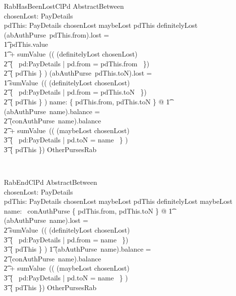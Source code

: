 \begin{LSDef}
\begin{schema}{RabHasBeenLostClPd}
  AbstractBetween
  \\ %
  chosenLost: \power PayDetails
  \\ %
  pdThis: PayDetails
\where %
  chosenLost \subseteq maybeLost
  \also %
  pdThis \in definitelyLost
  \also %
  (abAuthPurse~pdThis.from).lost =
  \\ %
  \t1 pdThis.value
  \\ %
  \t1 {} + sumValue~(( (definitelyLost \cup chosenLost)
  \\ %
  \t2 {} \cap \{~ pd:PayDetails | pd.from = pdThis.from ~\})
  \\ %
  \t2 \setminus \{ pdThis \} )
  \also %
  (abAuthPurse~pdThis.toN).lost =
  \\ %
  \t1 sumValue~(( (definitelyLost \cup chosenLost)
  \\ %
  \t2 {} \cap \{~ pd:PayDetails | pd.from = pdThis.toN ~\})
  \\ %
  \t2 \setminus \{ pdThis \} )
  \also %
  \forall name: \{ pdThis.from, pdThis.toN \} @
  \also %
  \t1 (abAuthPurse~name).balance =
  \\ %
  \t2 (conAuthPurse~name).balance
  \\ %
  \t2 {} + sumValue~(( (maybeLost \setminus chosenLost)
  \\ %
  \t3 {} \cap \{~ pd:PayDetails | pd.toN = name ~\} )
  \\ %
  \t3 \setminus \{ pdThis \})
  \also %
  OtherPursesRab
\end{schema}~\end{LSDef}

\begin{LSDef}
\begin{schema}{RabEndClPd}
  AbstractBetween
  \\ %
  chosenLost: \power PayDetails
  \\ %
  pdThis: PayDetails
\where %
  chosenLost \subseteq maybeLost
  \also %
  pdThis \notin definitelyLost \cup maybeLost
  \also %
  \forall name: \dom~conAuthPurse \cap \{ pdThis.from, pdThis.toN \} @
  \also %
  \t1 (abAuthPurse~name).lost =
  \\ %
  \t2 sumValue~(( (definitelyLost \cup chosenLost)
  \\ %
  \t3 {} \cap \{~ pd:PayDetails | pd.from = name ~\})
  \\ %
  \t3 \setminus \{ pdThis \} )
  \also %
  \t1 \land (abAuthPurse~name).balance =
  \\ %
  \t2 (conAuthPurse~name).balance
  \\ %
  \t2 {} + sumValue~(( (maybeLost \setminus chosenLost)
  \\ %
  \t3 {} \cap \{~ pd:PayDetails | pd.toN = name ~\} )
  \\ %
  \t3 \setminus \{ pdThis \})
  \also %
  OtherPursesRab
\end{schema}~\end{LSDef}

